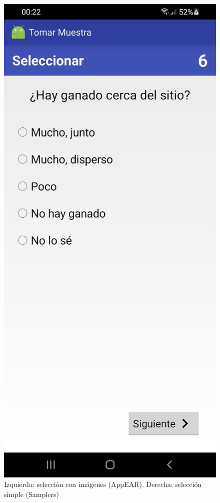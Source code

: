 \begin{figure}[H]
   \includegraphics[scale=0.3]{06-caso_de_uso/samplers_ganado.jpg} 
    \caption{Izquierda: selección con imágenes (AppEAR). Derecha:  selección simple (Samplers)}
\end{figure}

